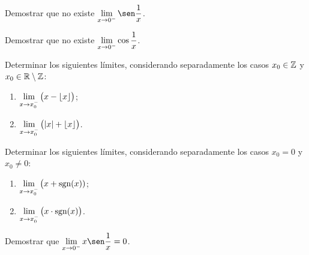 \item Demostrar que no existe $\D\lim_{x\to 0^-}\sen\frac1x$.

\item Demostrar que no existe $\displaystyle\lim_{x\to 0^-}\cos\frac1x$.

\item Determinar los siguientes límites, considerando separadamente los casos $x_0\in\mathbb{Z}$ y $x_0\in\mathbb{R}\setminus\mathbb{Z}$:
\begin{multicols}{2}
    \begin{enumerate}
    \item $\displaystyle\lim_{x\to x_0^-} \big(x-\lfloor x \rfloor\big)$;
    \item $\displaystyle\lim_{x\to x_0^-} \big(|x|+\lfloor x \rfloor\big)$.
    \end{enumerate}
\end{multicols}

\item Determinar los siguientes límites, considerando separadamente los casos $x_0=0$ y $x_0\neq 0$:
\begin{multicols}{2}
    \begin{enumerate}
    \item $\displaystyle\lim_{x\to x_0^-} \big(x+\operatorname{sgn}(x))$;
    \item $\displaystyle\lim_{x\to x_0^-} \big(x\cdot \operatorname{sgn}(x)\big)$.
    \end{enumerate}
    \end{multicols}

\item Demostrar que $\D\lim_{x\to 0^-} x \sen\frac1x = 0$.
